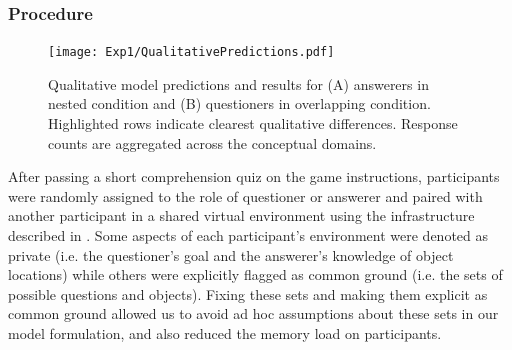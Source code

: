 \documentclass[11pt, floatsintext]{apa6}
\begin{document}

\subsubsection{Procedure}

\begin{figure}[h]
\begin{center}
\texttt{[image: Exp1/QualitativePredictions.pdf]}
\end{center}
\caption{\footnotesize  Qualitative model predictions and results for (A) answerers in nested condition and (B) questioners in overlapping condition. Highlighted rows indicate clearest qualitative differences. Response counts are aggregated across the conceptual domains.}
\label{fig:exp1qualitative}
\end{figure}

After passing a short comprehension quiz on the game instructions, participants were randomly assigned to the role of questioner or answerer and paired with another participant in a shared virtual environment using the infrastructure described in . 
Some aspects of each participant's environment were denoted as private (i.e. the questioner's goal and the answerer's knowledge of object locations) while others were explicitly flagged as common ground (i.e. the sets of possible questions and objects).
Fixing these sets and making them explicit as common ground allowed us to avoid ad hoc assumptions about these sets in our model formulation, and also reduced the memory load on participants.
\end{document}

